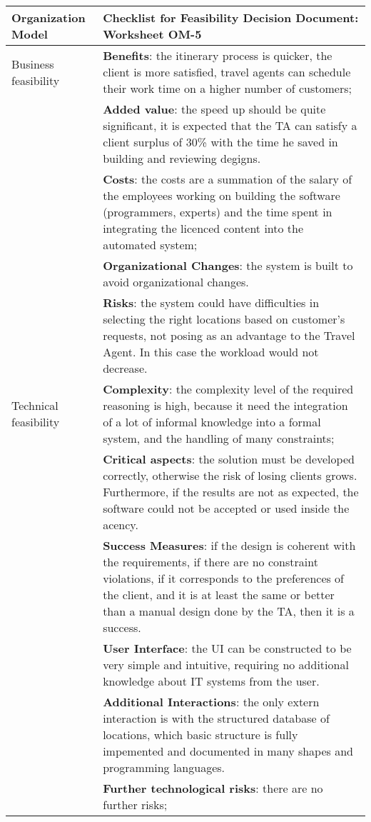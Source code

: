 \begin{tabular}%
       {|p{3cm}%
        |p{9.5cm}|}
\hline
{\bf Organization Model} &
  {\bf Checklist for Feasibility Decision Document: Worksheet OM-5} \\
\hline
\hline
\sc Business feasibility &
   {\rm  \textbf{Benefits}: the itinerary process is quicker, the client is more satisfied, travel agents can schedule their work time on a higher number of customers;} \\
 & {\rm \textbf{Added value}: the speed up should be quite significant, it is expected that the TA can satisfy a client surplus of 30\% with the time he saved in building and reviewing degigns.} \\
 & {\rm \textbf{Costs}: the costs are a summation of the salary of the employees working on building the software (programmers, experts) and the time spent in integrating the licenced content into the automated system;} \\
 & {\rm \textbf{Organizational Changes}: the system is built to avoid organizational changes.} \\
 & {\rm \textbf{Risks}: the system could have difficulties in selecting the right locations based on customer's requests, not posing as an advantage to the Travel Agent. In this case the workload would not decrease.} \\
\hline
\sc Technical feasibility &
   {\rm \textbf{Complexity}: the complexity level of the required reasoning is high, because it need the integration of a lot of informal knowledge into a formal system, and the handling of many constraints;} \\
 & {\rm \textbf{Critical aspects}: the solution must be developed correctly, otherwise the risk of losing clients grows. Furthermore, if the results are not as expected, the software could not be accepted or used inside the acency.} \\
 & {\rm \textbf{Success Measures}: if the design is coherent with the requirements, if there are no constraint violations, if it corresponds to the preferences of the client, and it is at least the same or better than a manual design done by the TA, then it is a success.} \\
 & {\rm \textbf{User Interface}: the UI can be constructed to be very simple and intuitive, requiring no additional knowledge about IT systems from the user. } \\
 & {\rm \textbf{Additional Interactions}: the only extern interaction is with the structured database of locations, which basic structure is fully impemented and documented in many shapes and programming languages.} \\
& {\rm \textbf{Further technological risks}: there are no further risks;} \\
\hline
\end{tabular}
